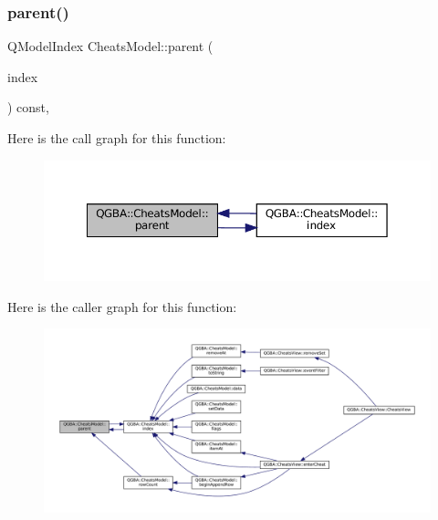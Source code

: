 \subsubsection{\texorpdfstring{parent()}{parent()}}
{\footnotesize\ttfamily Q\+Model\+Index Cheats\+Model\+::parent (\begin{DoxyParamCaption}\item[{const Q\+Model\+Index \&}]{index }\end{DoxyParamCaption}) const\hspace{0.3cm}{\ttfamily [override]}, {\ttfamily [virtual]}}

Here is the call graph for this function\+:
\nopagebreak
\begin{figure}[H]
\begin{center}
\leavevmode
\includegraphics[width=350pt]{class_q_g_b_a_1_1_cheats_model_a4afdb0b4cf8e3ee616a79ad63bb2e98b_cgraph}
\end{center}
\end{figure}
Here is the caller graph for this function\+:
\nopagebreak
\begin{figure}[H]
\begin{center}
\leavevmode
\includegraphics[width=350pt]{class_q_g_b_a_1_1_cheats_model_a4afdb0b4cf8e3ee616a79ad63bb2e98b_icgraph}
\end{center}
\end{figure}
\mbox{\label{class_q_g_b_a_1_1_cheats_model_a0247027ad4319ebfa3334a213a1bdb4e}} 
